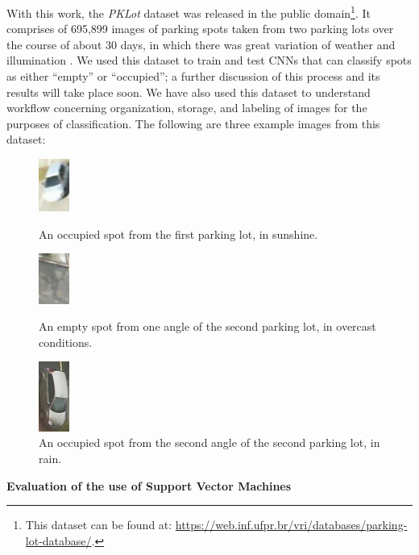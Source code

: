 \documentclass[a4paper, 11pt]{article} %
\begin{document}
    With this work, the \textit{PKLot} dataset was released in the public domain\footnote{This dataset 
    can be found at: 
    \hyperlink{https://web.inf.ufpr.br/vri/databases/parking-lot-database/}{https://web.inf.ufpr.br/vri/databases/parking-lot-database/}.}.
    It comprises of 695,899 images of parking spots taken from two parking lots over the course of 
    about 30 days, in which there was great variation of weather and illumination 
    \cite{pklot-paper}\relax. We used this dataset to train and test CNNs that can classify spots as 
    either ``empty'' or ``occupied''; a further discussion of this process and its results will take place 
    soon. We have also used this dataset to understand workflow concerning organization, storage, and 
    labeling of images for the purposes of classification. The following are three example images from 
    this dataset:
	\vskip 5mm
    \begin{figure}[h]
        \centering
        \includegraphics[width=1cm]{figures/example_1.jpg}
        \caption{An occupied spot from the first parking lot, in sunshine.}
        \vspace{5mm}
        \includegraphics[width=1cm]{figures/example_2.jpg}
        \caption{An empty spot from one angle of the second parking lot, in overcast conditions.}
        \vspace{5mm}
        \includegraphics[width=1cm]{figures/example_3.jpg}
        \caption{An occupied spot from the second angle of the second parking lot, in rain.}
    \end{figure}

    \hspace*{-6mm}\textbf{Evaluation of the use of Support Vector Machines}
    
\end{document}
